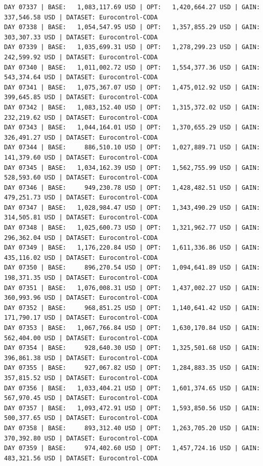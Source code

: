 \documentclass[11pt,a4paper]{article}
\begin{document}
\begin{verbatim}
DAY 07337 | BASE:   1,083,117.69 USD | OPT:   1,420,664.27 USD | GAIN: 337,546.58 USD | DATASET: Eurocontrol-CODA
DAY 07338 | BASE:   1,054,547.95 USD | OPT:   1,357,855.29 USD | GAIN: 303,307.33 USD | DATASET: Eurocontrol-CODA
DAY 07339 | BASE:   1,035,699.31 USD | OPT:   1,278,299.23 USD | GAIN: 242,599.92 USD | DATASET: Eurocontrol-CODA
DAY 07340 | BASE:   1,011,002.72 USD | OPT:   1,554,377.36 USD | GAIN: 543,374.64 USD | DATASET: Eurocontrol-CODA
DAY 07341 | BASE:   1,075,367.07 USD | OPT:   1,475,012.92 USD | GAIN: 399,645.85 USD | DATASET: Eurocontrol-CODA
DAY 07342 | BASE:   1,083,152.40 USD | OPT:   1,315,372.02 USD | GAIN: 232,219.62 USD | DATASET: Eurocontrol-CODA
DAY 07343 | BASE:   1,044,164.01 USD | OPT:   1,370,655.29 USD | GAIN: 326,491.27 USD | DATASET: Eurocontrol-CODA
DAY 07344 | BASE:     886,510.10 USD | OPT:   1,027,889.71 USD | GAIN: 141,379.60 USD | DATASET: Eurocontrol-CODA
DAY 07345 | BASE:   1,034,162.39 USD | OPT:   1,562,755.99 USD | GAIN: 528,593.60 USD | DATASET: Eurocontrol-CODA
DAY 07346 | BASE:     949,230.78 USD | OPT:   1,428,482.51 USD | GAIN: 479,251.73 USD | DATASET: Eurocontrol-CODA
DAY 07347 | BASE:   1,028,984.47 USD | OPT:   1,343,490.29 USD | GAIN: 314,505.81 USD | DATASET: Eurocontrol-CODA
DAY 07348 | BASE:   1,025,600.73 USD | OPT:   1,321,962.77 USD | GAIN: 296,362.04 USD | DATASET: Eurocontrol-CODA
DAY 07349 | BASE:   1,176,220.84 USD | OPT:   1,611,336.86 USD | GAIN: 435,116.02 USD | DATASET: Eurocontrol-CODA
DAY 07350 | BASE:     896,270.54 USD | OPT:   1,094,641.89 USD | GAIN: 198,371.35 USD | DATASET: Eurocontrol-CODA
DAY 07351 | BASE:   1,076,008.31 USD | OPT:   1,437,002.27 USD | GAIN: 360,993.96 USD | DATASET: Eurocontrol-CODA
DAY 07352 | BASE:     968,851.25 USD | OPT:   1,140,641.42 USD | GAIN: 171,790.17 USD | DATASET: Eurocontrol-CODA
DAY 07353 | BASE:   1,067,766.84 USD | OPT:   1,630,170.84 USD | GAIN: 562,404.00 USD | DATASET: Eurocontrol-CODA
DAY 07354 | BASE:     928,640.30 USD | OPT:   1,325,501.68 USD | GAIN: 396,861.38 USD | DATASET: Eurocontrol-CODA
DAY 07355 | BASE:     927,067.82 USD | OPT:   1,284,883.35 USD | GAIN: 357,815.52 USD | DATASET: Eurocontrol-CODA
DAY 07356 | BASE:   1,033,404.21 USD | OPT:   1,601,374.65 USD | GAIN: 567,970.45 USD | DATASET: Eurocontrol-CODA
DAY 07357 | BASE:   1,093,472.91 USD | OPT:   1,593,850.56 USD | GAIN: 500,377.65 USD | DATASET: Eurocontrol-CODA
DAY 07358 | BASE:     893,312.40 USD | OPT:   1,263,705.20 USD | GAIN: 370,392.80 USD | DATASET: Eurocontrol-CODA
DAY 07359 | BASE:     974,402.60 USD | OPT:   1,457,724.16 USD | GAIN: 483,321.56 USD | DATASET: Eurocontrol-CODA

\end{verbatim}
\end{document}
